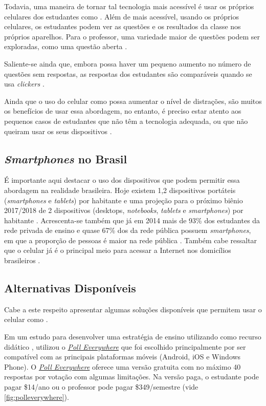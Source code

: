 Todavia, uma maneira de tornar tal tecnologia mais acessível é usar os próprios
celulares dos estudantes como {\clickers} \cite{Stowell2015, Morrell2015, Araujo2013}.
Além de mais acessível, usando os próprios celulares, os estudantes podem
ver as questões e os resultados da classe nos próprios aparelhos. Para o professor,
uma variedade maior de questões podem ser exploradas, como uma  questão aberta \cite{Stowell2015}.

Saliente-se ainda que, embora possa haver um pequeno aumento no número de questões
sem respostas, as respostas dos estudantes são comparáveis quando se usa
\textit{clickers} \cite{Morrell2015, Stowell2015}.

Ainda que o uso do celular como {\clicker} possa aumentar o nível de
distrações, são muitos os benefícios de usar essa abordagem, no entanto,
é preciso estar atento aos pequenos casos de estudantes que não têm a tecnologia
adequada, ou que não queiram usar os seus dispositivos \cite{Morrell2015, Stowell2015}.

\subsection*{\textit{Smartphones} no Brasil}

É importante aqui destacar o uso dos dispositivos que podem permitir essa abordagem
na realidade brasileira. Hoje existem 1,2 dispositivos portáteis
(\textit{smartphones} e \textit{tablets}) por habitante e uma projeção para o próximo
biênio 2017/2018 de 2 dispositivos
(desktops, \textit{notebooks}, \textit{tablets} e \textit{smartphones}) por habitante \cite[p. 8]{Meirelles2016}.
Acrescenta-se também que já em 2014 mais de 93\% dos estudantes da rede privada de
ensino e quase 67\% dos da rede pública possuem \textit{smartphones}, em que a
proporção de pessoas é maior na rede pública \cite[p. 55]{IBGE2016}. Também cabe
ressaltar que o celular já é o principal meio para acessar a Internet nos domicílios
brasileiros \cite[p. 41]{IBGE2016}.

\subsection*{Alternativas Disponíveis}
\label{subp:alternativas_disponiveis}

Cabe a este respeito apresentar algumas soluções disponíveis que permitem usar o celular como
{\clicker}.

Em um estudo para desenvolver uma estratégia de ensino utilizando
{\clickers} como recurso didático , utilizou o
\href{https://www.polleverywhere.com/}{\textit{Poll Everywhere}} que foi
escolhido principalmente por ser compatível com as principais plataformas
móveis (Android, iOS e Windows Phone). O
\href{https://www.polleverywhere.com/}{\textit{Poll Everywhere}} oferece uma
versão gratuita com no máximo 40 respostas por votação com algumas limitações.
Na versão paga, o estudante pode pagar \$14/ano ou o professor pode pagar
\$349/semestre (vide \autoref{fig:polleverywhere}).

